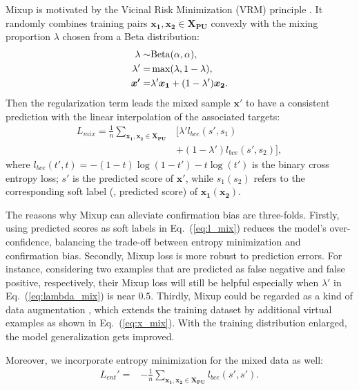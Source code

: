\documentclass[final]{cvpr}
\newcommand{\puset}{\bm{X_{PU}}}
\newcommand{\bangyan}[1]{#1}
\begin{document}
Mixup is motivated by the Vicinal Risk Minimization (VRM) principle \cite{DBLP:conf/nips/ChapelleWBV00}. It randomly combines training pairs $\bm{x_{1}}, \bm{x_{2}} \in \puset$ convexly \bangyan{with the mixing proportion $\lambda$ chosen from a Beta distribution}:
\begin{align}
    \lambda \sim & \rm{Beta}(\alpha, \alpha), \label{eq:alpha} \\
    \lambda' = & \max(\lambda, 1-\lambda), \label{eq:lambda_mix} \\ 
    \bm{x'} = & \lambda'\bm{x_{1}}+(1-\lambda')\bm{x_{2}}. \label{eq:x_mix}
\end{align}
Then the regularization term leads the mixed sample $\bm{x'}$ to have a consistent prediction with the linear interpolation of the associated targets:
\begin{align}
    L_{mix} = \frac{1}{n} \sum_{\bm{x_{1}},\bm{x_{2}} \in \puset} & [ \lambda' l_{bce}(s',s_{1}) \nonumber \\
    & + (1-\lambda') l_{bce}(s',s_{2}) ], \label{eq:l_mix}
\end{align}
where $l_{bce}(t',t)=-(1-t)\log{(1-t')}-t\log{(t')}$ is the binary cross entropy loss; $s'$ is the predicted score of $\bm{x'}$, while $s_{1} (s_{2})$ refers to the corresponding soft label (\ie, predicted score) of $\bm{x_{1}} (\bm{x_{2}})$. 

The reasons why Mixup can alleviate confirmation bias are three-folds. Firstly, using predicted scores as soft labels in Eq.~(\ref{eq:l_mix}) reduces the model's over-confidence, balancing the trade-off between entropy minimization and confirmation bias. Secondly, Mixup loss is more robust to prediction errors. For instance, considering two examples \bangyan{that are predicted as false negative and false positive, respectively}, their Mixup loss will still be helpful especially when $\lambda'$ in Eq.~(\ref{eq:lambda_mix}) is near $0.5$. Thirdly, Mixup \bangyan{could be regarded as a kind of data augmentation \cite{DBLP:conf/nips/SimardLDV96}}, which extends the training dataset by additional virtual examples as shown in Eq.~(\ref{eq:x_mix}). With the training distribution enlarged, the model generalization gets improved.

Moreover, we incorporate entropy minimization for the mixed data as well:
\begin{align}
    L_{ent}' = & -\frac{1}{n} \sum_{\bm{x_{1}},\bm{x_{2}} \in \puset} l_{bce}(s',s'). \label{eq:ent_}
\end{align}
\end{document}
